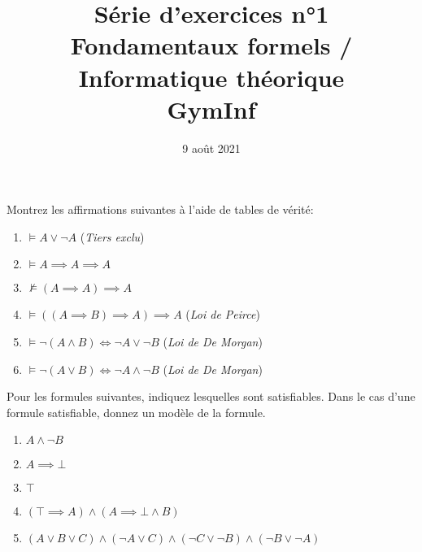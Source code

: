 \documentclass[12pt,french,a4paper]{article}
\begin{document}
\title{\vspace{-2cm}Série d'exercices n°1\\\large{Fondamentaux formels / Informatique théorique\\GymInf}}
\date{\vspace{-1cm}9 août 2021}

\maketitle

\begin{question}
Montrez les affirmations suivantes à l'aide de tables de vérité:
\begin{enumerate}
\item $\vDash A \vee \neg A$ \hspace{2em} (\textit{Tiers exclu})
\item $\vDash A \implies A \implies A$
\item $\not\vDash (A \implies A) \implies A$
\item $\vDash ((A \implies B) \implies A) \implies A$ \hspace{2em} (\textit{Loi de Peirce})
\item $\vDash \neg (A \wedge B) \iff \neg A \vee \neg B$ \hspace{2em} (\textit{Loi de De Morgan})
\item $\vDash \neg (A \vee B) \iff \neg A \wedge \neg B$ \hspace{2em} (\textit{Loi de De Morgan})
\end{enumerate}
\end{question}

\vspace{1cm}

\begin{question}
Pour les formules suivantes, indiquez lesquelles sont satisfiables.
Dans le cas d'une formule satisfiable, donnez un modèle de la formule.
\begin{enumerate}
\item $A \wedge \neg B$
\item $A \implies \bot$
\item $\top$
\item $(\top \implies A) \wedge (A \implies \bot \wedge B)$
\item $(A \vee B \vee C) \wedge (\neg A \vee C) \wedge (\neg C \vee \neg B) \wedge (\neg B \vee \neg A)$
\end{enumerate}
\end{question}
\end{document}
